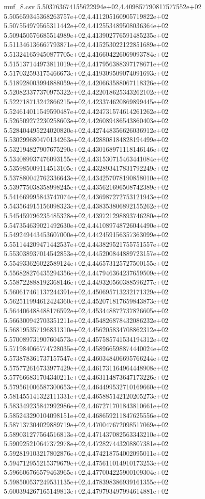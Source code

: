 \begin{filecontents*}{muf_8.csv}
5.503763674155622994e+02,4.409857790817577552e+02
5.505659345368263757e+02,4.411205160905719822e+02
5.507554979565311442e+02,4.412553489508036364e+02
5.509450576685514989e+02,4.413902776591485235e+02
5.511346136667793871e+02,4.415253022122851689e+02
5.513241659450877705e+02,4.416604226069093784e+02
5.515137144973811019e+02,4.417956388397178671e+02
5.517032593175466673e+02,4.419309509074091693e+02
5.518928003994888059e+02,4.420663588067118326e+02
5.520823377370975322e+02,4.422018625343262102e+02
5.522718713242866215e+02,4.423374620869899445e+02
5.524614011549590487e+02,4.424731574614261262e+02
5.526509272230258603e+02,4.426089486543860403e+02
5.528404495224020820e+02,4.427448356626036912e+02
5.530299680470134263e+02,4.428808184828194499e+02
5.532194827907675290e+02,4.430168971118146146e+02
5.534089937476093155e+02,4.431530715463441084e+02
5.535985009114513105e+02,4.432893417831792249e+02
5.537880042762336643e+02,4.434257078190858010e+02
5.539775038358998245e+02,4.435621696508742389e+02
5.541669995843747074e+02,4.436987272753121943e+02
5.543564915156098323e+02,4.438353806892155262e+02
5.545459796235485328e+02,4.439721298893746280e+02
5.547354639021492630e+02,4.441089748726044490e+02
5.549249443453607000e+02,4.442459156357363099e+02
5.551144209471442537e+02,4.443829521755751557e+02
5.553038937014542853e+02,4.445200844889723157e+02
5.554933626022589124e+02,4.446573125727500155e+02
5.556828276435294356e+02,4.447946364237659509e+02
5.558722888192368146e+02,4.449320560388596277e+02
5.560617461137244391e+02,4.450695713232171329e+02
5.562511994612424360e+02,4.452071817659843873e+02
5.564406488488176592e+02,4.453448872737826605e+02
5.566300942703351211e+02,4.454826878432086232e+02
5.568195357196831310e+02,4.456205834708862312e+02
5.570089731907604573e+02,4.457585741534194312e+02
5.571984066774728035e+02,4.458966598874440024e+02
5.573878361737157547e+02,4.460348406695766244e+02
5.575772616733977429e+02,4.461731164964448908e+02
5.577666831704340211e+02,4.463114873647173226e+02
5.579561006587300653e+02,4.464499532710169660e+02
5.581455141322111331e+02,4.465885142120205273e+02
5.583349235847992986e+02,4.467271701843810661e+02
5.585243290104098151e+02,4.468659211847625556e+02
5.587137304029889719e+02,4.470047672098517069e+02
5.589031277564516813e+02,4.471437082563343210e+02
5.590925210647372978e+02,4.472827443208807381e+02
5.592819103217802876e+02,4.474218754002095011e+02
5.594712955215379679e+02,4.475611014910173253e+02
5.596606766579463965e+02,4.477004225900109304e+02
5.598500537249531135e+02,4.478398386939161355e+02
5.600394267165149813e+02,4.479793497994614881e+02

\end{filecontents*}
